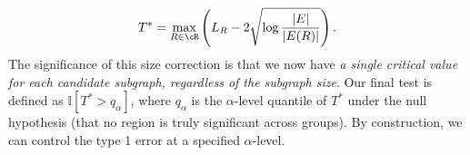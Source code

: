 {\begin{align} \label{eq:scanstat}
T^\ast=\max_{R\in\cR}\left(L_R-2\sqrt{\log\frac{|E|}{ |E(R)|}}\right).
\end{align}}
The significance of this size correction is that we now have \textit{a single critical value for each candidate subgraph, regardless of the subgraph size}. Our final test is defined as $\mathbb{I}[T^* > q_\alpha]$, where $q_\alpha$ is the $\alpha$-level quantile of $T^*$ under the null hypothesis (that no region is truly significant across groups). By construction, we can control the type 1 error at a specified $\alpha$-level.

